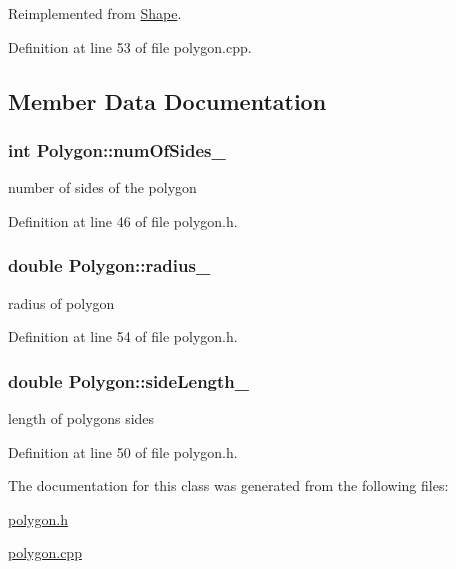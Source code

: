 Reimplemented from \hyperlink{class_shape_a116897479aa63aeea80648b7ac9e114a}{Shape}.



Definition at line 53 of file polygon.\+cpp.



\subsection{Member Data Documentation}
\hypertarget{class_polygon_a2c2596c34f01b275323971f8f29e4cd5}{}
\subsubsection[{num\+Of\+Sides\+\_\+}]{\setlength{\rightskip}{0pt plus 5cm}int Polygon\+::num\+Of\+Sides\+\_\+\hspace{0.3cm}{\ttfamily [protected]}}\label{class_polygon_a2c2596c34f01b275323971f8f29e4cd5}
number of sides of the polygon 

Definition at line 46 of file polygon.\+h.

\hypertarget{class_polygon_ae9ee97d51db108f9e2cc073aabaa68df}{}
\subsubsection[{radius\+\_\+}]{\setlength{\rightskip}{0pt plus 5cm}double Polygon\+::radius\+\_\+\hspace{0.3cm}{\ttfamily [protected]}}\label{class_polygon_ae9ee97d51db108f9e2cc073aabaa68df}
radius of polygon 

Definition at line 54 of file polygon.\+h.

\hypertarget{class_polygon_a22a65792492ceb172e3f9ac63a619864}{}
\subsubsection[{side\+Length\+\_\+}]{\setlength{\rightskip}{0pt plus 5cm}double Polygon\+::side\+Length\+\_\+\hspace{0.3cm}{\ttfamily [protected]}}\label{class_polygon_a22a65792492ceb172e3f9ac63a619864}
length of polygon\textquotesingle{}s sides 

Definition at line 50 of file polygon.\+h.



The documentation for this class was generated from the following files\+:\begin{DoxyCompactItemize}
\item 
\hyperlink{polygon_8h}{polygon.\+h}\item 
\hyperlink{polygon_8cpp}{polygon.\+cpp}\end{DoxyCompactItemize}
